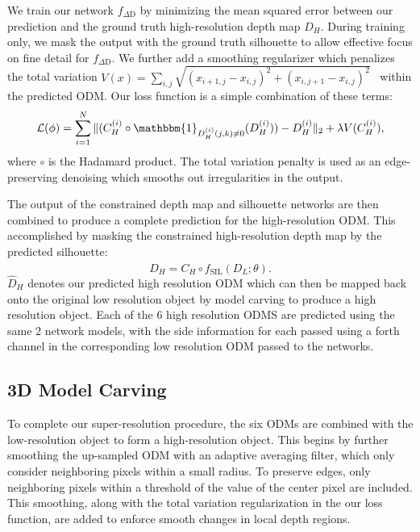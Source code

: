 \documentclass{article}
\begin{document}
We train our network $f_{\Delta \text{D}}$ by minimizing the mean squared error between our prediction and the ground truth high-resolution depth map $D_H$. During training only, we mask the output with the ground truth silhouette to allow effective focus on fine detail for $f_{\Delta \text{D}}$. We further add a smoothing regularizer which penalizes the total variation $V(x) = \sum_{i,j} \sqrt{(x_{i+1,j} - x_{i,j})^2 + (x_{i,j+1} - x_{i,j})^2}$~\cite{rudin1992nonlinear} within the predicted ODM. Our loss function is a simple combination of these terms:
\begin{equation}
\mathcal{L}(\phi) = \sum_{i=1}^N \Vert (C_H^{(i)} \circ \mathbbm{1}_{D_H^{(i)}(j,k) \neq 0}(D_H^{(i)})) - D_H^{(i)} \Vert_2 + \lambda V(C_H^{(i)}),
\end{equation}
where $\circ$ is the Hadamard product. The total variation penalty is used as an edge-preserving denoising which smooths out irregularities in the output. 
 
The output of the constrained depth map and silhouette networks are then combined to produce a complete prediction for the high-resolution ODM. This accomplished by masking the constrained high-resolution depth map by the predicted silhouette: 
\begin{equation}
\hat D_H = C_H \circ f_{\text{SIL}}(D_L; \theta).
\end{equation}
$\hat D_H$ denotes our predicted high resolution ODM which can then be mapped back onto the original low resolution object by model carving to produce a high resolution object. Each of the 6 high resolution ODMS are predicted using the same 2 network models, with the side information for each passed using a forth channel in the corresponding low resolution ODM passed to the networks. 

\subsection{3D Model Carving} \label{sec:model-carving}

To complete our super-resolution procedure, the six ODMs are combined with the low-resolution object to form a high-resolution object. This begins by further smoothing the up-sampled ODM with an adaptive averaging filter, which only consider neighboring pixels within a small radius. To preserve edges, only neighboring pixels within a threshold of the value of the center pixel are included. This smoothing, along with the total variation regularization in the our loss function, are added to enforce smooth changes in local depth regions. 
\end{document}
